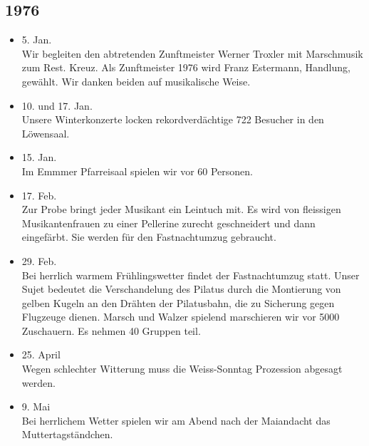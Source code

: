 \subsection*{1976}

\begin{history}


    \begin{itemize}

        \item 5. Jan.\\
              Wir begleiten den abtretenden Zunftmeister Werner Troxler mit
              Marschmusik zum Rest. Kreuz. Als Zunftmeister 1976 wird Franz Estermann,
              Handlung, gewählt. Wir danken beiden auf musikalische Weise.

        \item 10. und 17. Jan.\\
              Unsere Winterkonzerte locken rekordverdächtige 722 Besucher in den
              Löwensaal.

        \item 15. Jan.\\
              Im Emmmer Pfarreisaal spielen wir vor 60 Personen.

        \item 17. Feb.\\
              Zur Probe bringt jeder Musikant ein Leintuch mit. Es wird von fleissigen
              Musikantenfrauen zu einer Pellerine zurecht geschneidert und dann
              eingefärbt. Sie werden für den Fastnachtumzug gebraucht.

        \item 29. Feb.\\
              Bei herrlich warmem Frühlingswetter findet der Fastnachtumzug statt.
              Unser Sujet bedeutet die Verschandelung des Pilatus durch die Montierung
              von gelben Kugeln an den Drähten der Pilatusbahn, die zu Sicherung gegen
              Flugzeuge dienen. Marsch und Walzer spielend marschieren wir vor 5000
              Zuschauern. Es nehmen 40 Gruppen teil.

        \item 25. April\\
              Wegen schlechter Witterung muss die Weiss-Sonntag Prozession abgesagt
              werden.

        \item 9. Mai\\
              Bei herrlichem Wetter spielen wir am Abend nach der Maiandacht das
              Muttertagständchen.


\end{itemize}
\end{history}
